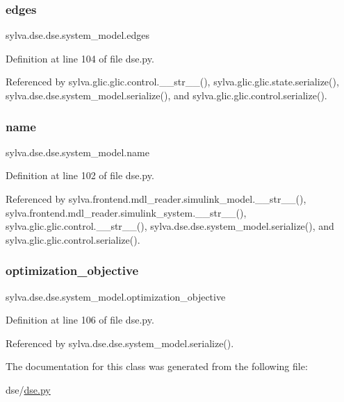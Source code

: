 \subsubsection{\texorpdfstring{edges}{edges}}
{\footnotesize\ttfamily sylva.\+dse.\+dse.\+system\+\_\+model.\+edges}



Definition at line 104 of file dse.\+py.



Referenced by sylva.\+glic.\+glic.\+control.\+\_\+\+\_\+str\+\_\+\+\_\+(), sylva.\+glic.\+glic.\+state.\+serialize(), sylva.\+dse.\+dse.\+system\+\_\+model.\+serialize(), and sylva.\+glic.\+glic.\+control.\+serialize().

\mbox{\label{classsylva_1_1dse_1_1dse_1_1system__model_a8b435a2014aa563c8cb50ce7d91dfdc8}} 
\subsubsection{\texorpdfstring{name}{name}}
{\footnotesize\ttfamily sylva.\+dse.\+dse.\+system\+\_\+model.\+name}



Definition at line 102 of file dse.\+py.



Referenced by sylva.\+frontend.\+mdl\+\_\+reader.\+simulink\+\_\+model.\+\_\+\+\_\+str\+\_\+\+\_\+(), sylva.\+frontend.\+mdl\+\_\+reader.\+simulink\+\_\+system.\+\_\+\+\_\+str\+\_\+\+\_\+(), sylva.\+glic.\+glic.\+control.\+\_\+\+\_\+str\+\_\+\+\_\+(), sylva.\+dse.\+dse.\+system\+\_\+model.\+serialize(), and sylva.\+glic.\+glic.\+control.\+serialize().

\mbox{\label{classsylva_1_1dse_1_1dse_1_1system__model_acdb0fd58cbe5281c46488bd3981edc19}} 
\subsubsection{\texorpdfstring{optimization\+\_\+objective}{optimization\_objective}}
{\footnotesize\ttfamily sylva.\+dse.\+dse.\+system\+\_\+model.\+optimization\+\_\+objective}



Definition at line 106 of file dse.\+py.



Referenced by sylva.\+dse.\+dse.\+system\+\_\+model.\+serialize().



The documentation for this class was generated from the following file\+:\begin{DoxyCompactItemize}
\item 
dse/\hyperlink{dse_8py}{dse.\+py}\end{DoxyCompactItemize}
